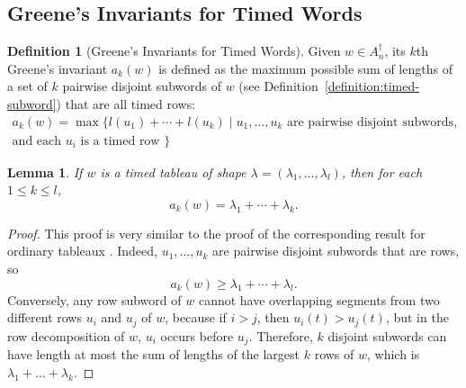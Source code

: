 \documentclass[10pt]{amsproc}
\newtheorem{lemma}[theorem]{Lemma}
\theoremstyle{definition}
\newtheorem{definition}[theorem]{Definition}
\theoremstyle{remark}
\begin{document}
\subsection{Greene's Invariants for Timed Words}
\label{sec:timed-greene-invar}
\begin{definition}[Greene's Invariants for Timed Words]
  \label{definition:timed-Greene-invars}
  Given $w\in A_n^\dagger$, its $k$th Greene's invariant $a_k(w)$ is defined as the maximum possible sum of lengths of a set of $k$ pairwise disjoint subwords of $w$ (see Definition~\ref{definition:timed-subword}) that are all timed rows:
  \begin{multline*}
    a_k(w) = \max\{l(u_1)+\dotsb+l(u_k)\mid u_1,\dotsc,u_k \text{ are pairwise disjoint subwords,}\\ \text{and each $u_i$ is a timed row }\}
  \end{multline*}
\end{definition}
\begin{lemma}
  \label{lemma:tableau-shape-greene}
  If $w$ is a timed tableau of shape $\lambda=(\lambda_1,\dotsc,\lambda_l)$, then for each $1\leq k\leq l$,
  \begin{displaymath}
    a_k(w) = \lambda_1+\dotsb + \lambda_k.
  \end{displaymath}
\end{lemma}
\begin{proof}
  This proof is very similar to the proof of the corresponding result for ordinary tableaux \cite{Greene-schen,Lascoux}.
  Indeed, $u_1,\dotsc,u_k$ are pairwise disjoint subwords that are rows, so
  \begin{displaymath}
    a_k(w) \geq \lambda_1+\dotsb + \lambda_l.
  \end{displaymath}
  Conversely, any row subword of $w$ cannot have overlapping segments from two different rows $u_i$ and $u_j$ of $w$, because if $i>j$, then $u_i(t)>u_j(t)$, but in the row decomposition of $w$, $u_i$ occurs before $u_j$.
  Therefore, $k$ disjoint subwords can have length at most the sum of lengths of the largest $k$ rows of $w$, which is $\lambda_1+\dotsc+\lambda_k$.
\end{proof}
\end{document}
